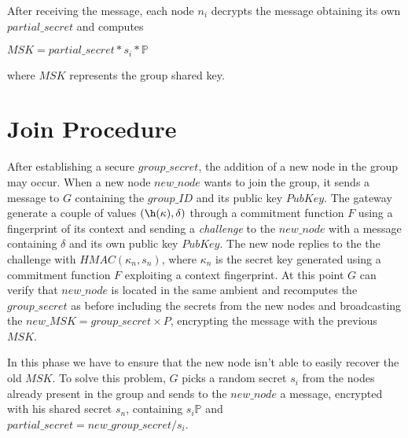 After receiving the message, each node $n_i$ decrypts the message obtaining its own $partial\_secret$ and computes  
\begin{center}
$MSK = partial\_secret * s_i * \mathbb{P}$
\end{center}
where $MSK$ represents the group shared key.

\section{Join Procedure}
After establishing a secure $group\_secret$, the addition of a new node in the group may occur. 
When a new node $new\_node$ wants to join the group, it sends a message to $G$ containing the $group\_ID$ and its public key $PubKey$.
The gateway generate a couple of values $(\h(\kappa), \delta)$ through a commitment function $F$ using a fingerprint of its context and sending a \textit{challenge} to the $new\_node$ with a message containing $\delta$ and its own public key $PubKey$.
The new node replies to the the challenge with $HMAC(\kappa_n, s_n)$, where $\kappa_n$ is the secret key generated using a commitment function $F$ exploiting a context fingerprint.
At this point $G$ can verify that $new\_node$ is located in the same ambient and recomputes the $group\_secret$ as before including the secrets from the new nodes and broadcasting the $new\_MSK = group\_secret \times P$, encrypting the message with the previous $MSK$. 

In this phase we have to ensure that the new node isn't able to easily recover the old $MSK$. 
To solve this problem, $G$ picks a random secret $s_i$ from the nodes already present in the group  and sends to the $new\_node$ a message, encrypted with his shared secret $s_n$, containing $s_{i}\mathbb{P}$ and $partial\_secret = new\_group\_secret / s_i$.

